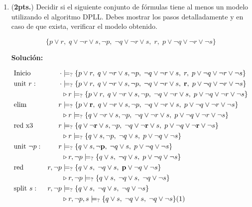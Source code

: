 \documentclass[11pt,letterpaper]{article}
\begin{document}
\begin{enumerate}
  \medskip
    
\item (\textbf{2pts.}) Decidir si el siguiente conjunto de fórmulas tiene al 
menos un modelo utilizando el algoritmo DPLL. Debes mostrar los pasos detalladamente y en caso de que exista, verificar el modelo obtenido.

\[
  \{p\lor r,\;q\lor\neg r\lor s,\neg p,\;\neg q\lor\neg r\lor s,\;r,\;p\lor\neg q\lor \neg r\lor\neg s\}
  \]

  \hfill\break
  {\bf Solución:}
  
  \begin{align*}
    &\text{Inicio} & \cdot &\models_? \{p\lor r,\;q\lor\neg r\lor s,\neg p,\;\neg q\lor\neg r\lor s,\;r,\;p\lor\neg q\lor \neg r\lor\neg s\}\\
    &\text{unit } r : & \cdot &\models_?   \{p\lor r,\;q\lor\neg r\lor s,\neg p,\;\neg q\lor\neg r\lor s,\;{\bf r},\;p\lor\neg q\lor \neg r\lor\neg s\}\\
    & & &\triangleright r \models_? \{p\lor r,\;q\lor\neg r\lor s,\neg p,\;\neg q\lor\neg r\lor s,\;p\lor\neg q\lor \neg r\lor\neg s\}\\
    &\text{elim }& r &\models_? \{p\lor {\bf r},\;q\lor\neg r\lor s,\neg p,\;\neg q\lor\neg r\lor s,\;p\lor\neg q\lor \neg r\lor\neg s\}\\
    & & &\triangleright r \models_? \{q\lor\neg r\lor s,\neg p,\;\neg q\lor\neg r\lor s,\;p\lor\neg q\lor \neg r\lor\neg s\}\\
    &\text{red x3 }& r &\models_? \{q\lor{\bf \neg r}\lor s,\neg p,\;\neg q\lor{\bf \neg r}\lor s,\;p\lor\neg q\lor {\bf \neg r}\lor\neg s\}\\
    & & &\triangleright r \models_? \{q\lor s,\neg p,\;\neg q\lor s,\;p\lor\neg q\lor\neg s\}\\
    &\text{unit }\neg p: & r &\models_? \{q\lor s,{\bf \neg p},\;\neg q\lor s,\;p\lor\neg q\lor\neg s\}\\
    & & &\triangleright r, \neg p \models_? \{q\lor s,\;\neg q\lor s,\;p\lor\neg q\lor\neg s\}\\
    &\text{red }& r, \neg p &\models_? \{q\lor s,\;\neg q\lor s,\;{\bf p}\lor\neg q\lor\neg s\}\\
    & & &\triangleright r, \neg p \models_? \{q\lor s,\;\neg q\lor s,\;\neg q\lor\neg s\}\\
    &\text{split } s: & r, \neg p &\models_? \{q\lor s,\;\neg q\lor s,\;\neg q\lor\neg s\}\\
    & & &\triangleright r, \neg p, s \models_? \{q\lor s,\;\neg q\lor s,\;\neg q\lor\neg s\}(1)\\

\end{align*}
\end{enumerate}
\end{document}
